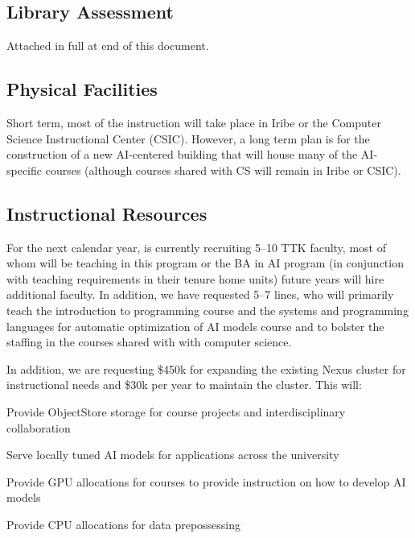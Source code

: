 
\newcommand{\ptkfaculty}{5--7}
\newcommand{\ttkfaculty}{5--10}
\newcommand{\advisors}{5}
\newcommand{\admin}{1}
\newcommand{\cloud}{30k}
\newcommand{\upfrontcluster}{450k}
\newcommand{\continuingcluster}{30k}

\subsection{Library Assessment}

Attached in full at end of this document.

\subsection{Physical Facilities}

Short term, most of the instruction will take place in Iribe or the Computer Science Instructional Center (CSIC).  However, a long term plan is for the construction of a new AI-centered building that will house many of the AI-specific courses (although courses shared with CS will remain in Iribe or CSIC).

\subsection{Instructional Resources}

For the next calendar year, \aim{} is currently recruiting \ttkfaculty{} TTK faculty, most of whom will be teaching in this program or the BA in AI program (in conjunction with teaching requirements in their tenure home units) future years will hire additional faculty.  In addition, we have requested \ptkfaculty{} lines, who will primarily teach the introduction to programming course and the systems and programming languages for automatic optimization of AI models course and to bolster the staffing in the courses shared with with computer science.

In addition, we are requesting \$\upfrontcluster{} for expanding the existing Nexus cluster for instructional needs and \$\continuingcluster{} per year to maintain the cluster.  This will:
\begin{itemize*}
    \item Provide ObjectStore storage for course projects and interdisciplinary collaboration
    \item Serve locally tuned AI models for applications across the university
    \item Provide GPU allocations for courses to provide instruction on how to develop AI models
    \item Provide CPU allocations for data prepossessing
\end{itemize*}

